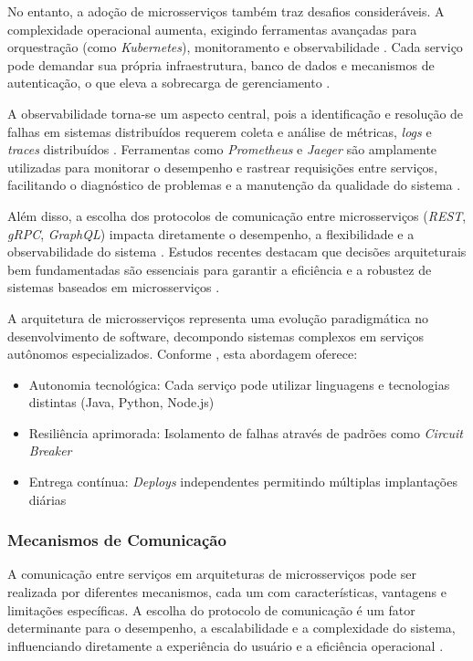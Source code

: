 No entanto, a adoção de microsserviços também traz desafios consideráveis. A complexidade operacional aumenta, exigindo ferramentas avançadas para orquestração (como \textit{Kubernetes}), monitoramento e observabilidade \cite{jamshidi2016systematic, shekhar2023microservices}. Cada serviço pode demandar sua própria infraestrutura, banco de dados e mecanismos de autenticação, o que eleva a sobrecarga de gerenciamento \cite{nizami2020comparison}.

A observabilidade torna-se um aspecto central, pois a identificação e resolução de falhas em sistemas distribuídos requerem coleta e análise de métricas, \textit{logs} e \textit{traces} distribuídos \cite{observability2023, sha2023automating}. Ferramentas como \textit{Prometheus} e \textit{Jaeger} são amplamente utilizadas para monitorar o desempenho e rastrear requisições entre serviços, facilitando o diagnóstico de problemas e a manutenção da qualidade do sistema \cite{ahmed2022observability}. 

Além disso, a escolha dos protocolos de comunicação entre microsserviços (\textit{\gls{REST}}, \textit{\gls{gRPC}}, \textit{\gls{GraphQL}}) impacta diretamente o desempenho, a flexibilidade e a observabilidade do sistema \cite{niswar2023performance}. Estudos recentes destacam que decisões arquiteturais bem fundamentadas são essenciais para garantir a eficiência e a robustez de sistemas baseados em microsserviços \cite{niswar2023performance, sha2023automating}. 

A arquitetura de microsserviços representa uma evolução paradigmática no desenvolvimento de software, decompondo sistemas complexos em serviços autônomos especializados. Conforme \cite{jamshidi2016systematic}, esta abordagem oferece:

\begin{itemize}
    \item Autonomia tecnológica: Cada serviço pode utilizar linguagens e tecnologias distintas (Java, Python, Node.js)
    \item Resiliência aprimorada: Isolamento de falhas através de padrões como \textit{Circuit Breaker}
    \item Entrega contínua: \textit{Deploys} independentes permitindo múltiplas implantações diárias
\end{itemize}

\subsubsection{Mecanismos de Comunicação}
A comunicação entre serviços em arquiteturas de microsserviços pode ser realizada por diferentes mecanismos, cada um com características, vantagens e limitações específicas. A escolha do protocolo de comunicação é um fator determinante para o desempenho, a escalabilidade e a complexidade do sistema, influenciando diretamente a experiência do usuário e a eficiência operacional \cite{niswar2023performance, maso2024comparativo}.

